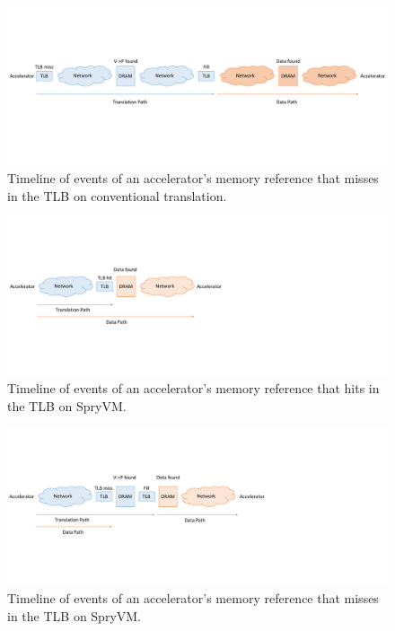 \begin{figure}
	\includegraphics[width=\textwidth]{figures/time_event_base.pdf}
	\caption{Timeline of events of an accelerator's memory reference that misses in the TLB on conventional translation.}
	\label{fig:pagewalk_base}
\end{figure}

\begin{figure}
	\includegraphics[width=\textwidth]{figures/time_event_partition_hit.pdf}
	\caption{Timeline of events of an accelerator's memory reference that hits in the TLB on SpryVM.}
	\label{fig:pagewalk_partition_hit}
\end{figure}

\begin{figure}
	\includegraphics[width=\textwidth]{figures/time_event_partition_miss.pdf}
	\caption{Timeline of events of an accelerator's memory reference that misses in the TLB on SpryVM.}
	\label{fig:pagewalk_partition_miss}
\end{figure}


